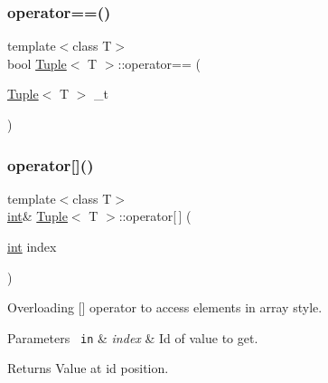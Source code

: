 \mbox{\label{class_tuple_ad8f90a7c0726fae5ac5651c4e16222cd}} 
\subsubsection{\texorpdfstring{operator==()}{operator==()}}
{\footnotesize\ttfamily template$<$class T$>$ \\
bool \mbox{\hyperlink{class_tuple}{Tuple}}$<$ T $>$\+::operator== (\begin{DoxyParamCaption}\item[{\mbox{\hyperlink{class_tuple}{Tuple}}$<$ T $>$}]{\+\_\+t }\end{DoxyParamCaption})\hspace{0.3cm}{\ttfamily [inline]}}

\mbox{\label{class_tuple_acfc65dc0a9af20f2ff8cff2bf3448324}} 
\subsubsection{\texorpdfstring{operator[]()}{operator[]()}}
{\footnotesize\ttfamily template$<$class T$>$ \\
\mbox{\hyperlink{draw_8hh_aa620a13339ac3a1177c86edc549fda9b}{int}}\& \mbox{\hyperlink{class_tuple}{Tuple}}$<$ T $>$\+::operator\mbox{[}$\,$\mbox{]} (\begin{DoxyParamCaption}\item[{\mbox{\hyperlink{draw_8hh_aa620a13339ac3a1177c86edc549fda9b}{int}}}]{index }\end{DoxyParamCaption})\hspace{0.3cm}{\ttfamily [inline]}}



Overloading \mbox{[}\mbox{]} operator to access elements in array style. 


\begin{DoxyParams}[1]{Parameters}
\mbox{\texttt{ in}}  & {\em index} & Id of value to get. \\
\hline
\end{DoxyParams}
\begin{DoxyReturn}{Returns}
Value at id position. 
\end{DoxyReturn}
\mbox{\label{class_tuple_a53a1abc3017d30cf1a6d6858caee8ce8}} 
